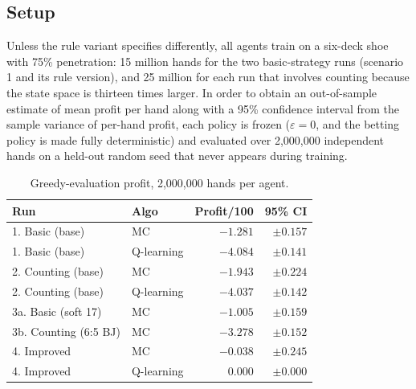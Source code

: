 \documentclass[conference,a4paper]{IEEEtran}
\begin{document}
\subsection{Setup}
Unless the rule variant specifies differently, all agents train on a six-deck shoe with 75\% penetration: 15 million hands for the two basic-strategy runs (scenario 1 and its rule version), and 25 million for each run that involves counting because the state space is thirteen times larger. In order to obtain an out-of-sample estimate of mean profit per hand along with a 95\% confidence interval from the sample variance of per-hand profit, each policy is frozen ($\varepsilon=0$, and the betting policy is made fully deterministic) and evaluated over 2{,}000{,}000 independent hands on a held-out random seed that never appears during training.

\begin{table}[t]
\centering
\caption{Greedy-evaluation profit, 2{,}000{,}000 hands per agent.}
\label{tab:results}
\footnotesize
\begin{tabular}{@{}llrr@{}}
\toprule
Run & Algo & Profit/100 & 95\% CI \\
\midrule
1. Basic (base) & MC & $-1.281$ & $\pm 0.157$ \\
1. Basic (base) & Q-learning & $-4.084$ & $\pm 0.141$ \\
2. Counting (base) & MC & $-1.943$ & $\pm 0.224$ \\
2. Counting (base) & Q-learning & $-4.037$ & $\pm 0.142$ \\
3a. Basic (soft 17) & MC & $-1.005$ & $\pm 0.159$ \\
3b. Counting (6:5 BJ) & MC & $-3.278$ & $\pm 0.152$ \\
4. Improved & MC & $-0.038$ & $\pm 0.245$ \\
4. Improved & Q-learning & $0.000$ & $\pm 0.000$ \\
\bottomrule
\end{tabular}
\end{table}
\end{document}

